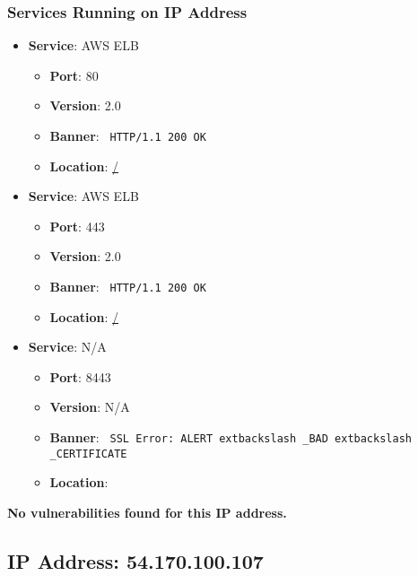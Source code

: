 \documentclass{article}
\begin{document}
\subsubsection*{Services Running on IP Address}

\begin{itemize}
    
        \item \textbf{Service}: AWS ELB
        \begin{itemize}
            \item \textbf{Port}: 80
            \item \textbf{Version}:  2.0 
            \item \textbf{Banner}: \texttt{ HTTP/1.1 200 OK
 }
            \item \textbf{Location}: \href{ / }{ / }
        \end{itemize}
    
        \item \textbf{Service}: AWS ELB
        \begin{itemize}
            \item \textbf{Port}: 443
            \item \textbf{Version}:  2.0 
            \item \textbf{Banner}: \texttt{ HTTP/1.1 200 OK
 }
            \item \textbf{Location}: \href{ / }{ / }
        \end{itemize}
    
        \item \textbf{Service}: N/A
        \begin{itemize}
            \item \textbf{Port}: 8443
            \item \textbf{Version}:  N/A 
            \item \textbf{Banner}: \texttt{ SSL Error: ALERT	extbackslash _BAD	extbackslash _CERTIFICATE }
            \item \textbf{Location}: \href{  }{  }
        \end{itemize}
    
\end{itemize}


\textbf{No vulnerabilities found for this IP address.}


\clearpage



\subsection*{IP Address: 54.170.100.107}
\end{document}
